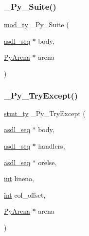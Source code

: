 \mbox{\label{_python-ast_8h_a7a0cc82ce7beb48bc2e9811f63ce1d9f}} 
\subsubsection{\texorpdfstring{\_Py\_Suite()}{\_Py\_Suite()}}
{\footnotesize\ttfamily \mbox{\hyperlink{_python-ast_8h_ac5ca223bf2573144610f74dc91fc431e}{mod\+\_\+ty}} \+\_\+\+Py\+\_\+\+Suite (\begin{DoxyParamCaption}\item[{\mbox{\hyperlink{structasdl__seq}{asdl\+\_\+seq}} $\ast$}]{body,  }\item[{\mbox{\hyperlink{pyarena_8h_a9edeb357fbb27333471022a0975adb7a}{Py\+Arena}} $\ast$}]{arena }\end{DoxyParamCaption})}

\mbox{\label{_python-ast_8h_ae5f1aab66bb67790df6acd7da5c88846}} 
\subsubsection{\texorpdfstring{\_Py\_TryExcept()}{\_Py\_TryExcept()}}
{\footnotesize\ttfamily \mbox{\hyperlink{_python-ast_8h_a39618071027b661bc03e8916e664e1a7}{stmt\+\_\+ty}} \+\_\+\+Py\+\_\+\+Try\+Except (\begin{DoxyParamCaption}\item[{\mbox{\hyperlink{structasdl__seq}{asdl\+\_\+seq}} $\ast$}]{body,  }\item[{\mbox{\hyperlink{structasdl__seq}{asdl\+\_\+seq}} $\ast$}]{handlers,  }\item[{\mbox{\hyperlink{structasdl__seq}{asdl\+\_\+seq}} $\ast$}]{orelse,  }\item[{\mbox{\hyperlink{warnings_8h_a74f207b5aa4ba51c3a2ad59b219a423b}{int}}}]{lineno,  }\item[{\mbox{\hyperlink{warnings_8h_a74f207b5aa4ba51c3a2ad59b219a423b}{int}}}]{col\+\_\+offset,  }\item[{\mbox{\hyperlink{pyarena_8h_a9edeb357fbb27333471022a0975adb7a}{Py\+Arena}} $\ast$}]{arena }\end{DoxyParamCaption})}

\mbox{\label{_python-ast_8h_acb1710941c4c76ee877ee4135ced2b96}} 
